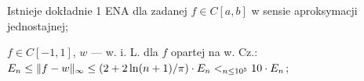 \entry
Istnieje dokładnie 1 ENA dla zadanej 
$f\in C[a,b]$ 
w sensie aproksymacji jednostajnej;


\entry
$f \in C[-1,1]$,
$w$ --- w. i. L. dla $f$ opartej na w. Cz.:
$E_n \leq
\|f - w\|_\infty \leq
(2 + 2 \ln(n + 1) / \pi)\cdot E_n <_{n \leq 10^5}
10\cdot E_n$;
